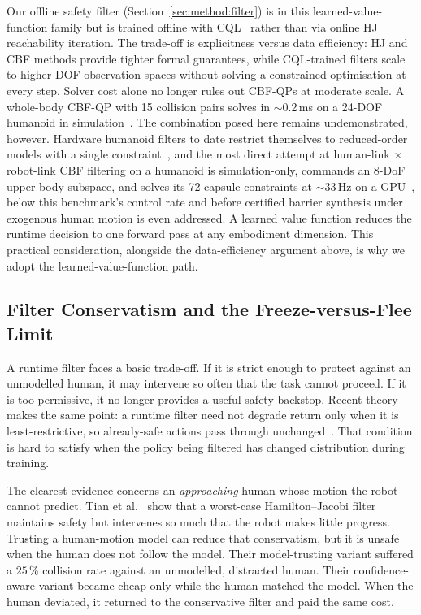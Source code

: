 \documentclass[11pt,a4paper]{report}
\begin{document}
Our offline safety filter (Section~\ref{sec:method:filter}) is in
this learned-value-function family but is trained offline with
\textsc{CQL}~\cite{kumar2020cql} rather than via online HJ
reachability iteration. The trade-off is explicitness versus
data efficiency: HJ and CBF methods provide tighter formal
guarantees, while \textsc{CQL}-trained filters scale to higher-DOF
observation spaces without solving a constrained optimisation at
every step. Solver cost alone no longer rules out CBF-QPs at
moderate scale. A whole-body CBF-QP with 15 collision pairs solves
in $\sim$0.2\,ms on a 24-DOF humanoid in
simulation~\cite{khazoom2022selfcollision}. The combination posed here remains
undemonstrated, however. Hardware humanoid filters to date restrict
themselves to reduced-order models with a single
constraint~\cite{shield2025}, and the most direct
attempt at human-link $\times$ robot-link CBF filtering on a
humanoid is simulation-only, commands an 8-DoF upper-body subspace,
and solves its 72 capsule constraints at $\sim$33\,Hz on a
GPU~\cite{cai2026humanoidcbf}, below this benchmark's control rate
and before certified barrier synthesis under exogenous human motion
is even addressed. A learned value function reduces the runtime
decision to one forward pass at any embodiment dimension. This
practical consideration, alongside the data-efficiency argument
above, is why we adopt the learned-value-function path.

\subsection{Filter Conservatism and the Freeze-versus-Flee Limit}
\label{sec:bg:cbf:conservatism}

A runtime filter faces a basic trade-off. If it is strict enough to
protect against an unmodelled human, it may intervene so often that the
task cannot proceed. If it is too permissive, it no longer provides a
useful safety backstop. Recent theory makes the same point: a runtime
filter need not degrade return only when it is least-restrictive, so
already-safe actions pass through unchanged~\cite{permissivefilter2025}.
That condition is hard to satisfy when the policy being filtered has
changed distribution during training.

The clearest evidence concerns an \emph{approaching} human whose motion
the robot cannot predict. Tian et al.~\cite{tian2022confidence} show
that a worst-case Hamilton--Jacobi filter maintains safety but
intervenes so much that the robot makes little progress. Trusting a
human-motion model can reduce that conservatism, but it is unsafe when
the human does not follow the model. Their model-trusting variant
suffered a $25\,\%$ collision rate against an unmodelled, distracted
human. Their confidence-aware variant became cheap only while the human
matched the model. When the human deviated, it returned to the
conservative filter and paid the same cost.
\end{document}
